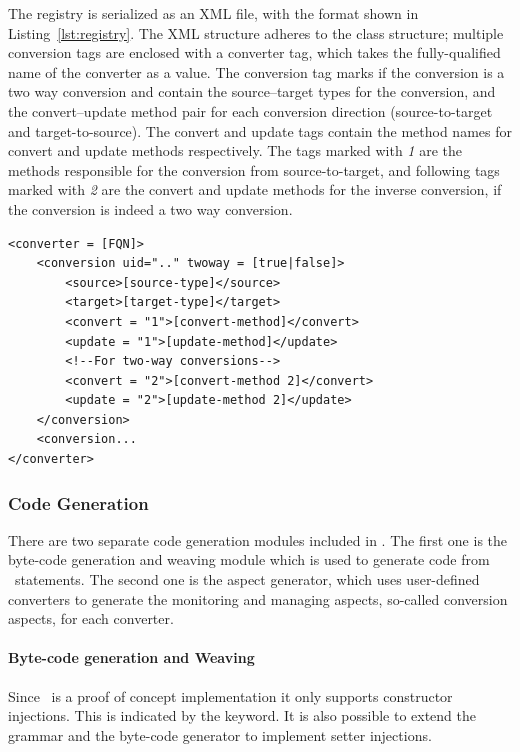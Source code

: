 The registry is serialized as an XML file, with the format shown in Listing~\ref{lst:registry}. 
The XML structure adheres to the class structure; multiple conversion tags are enclosed with a converter tag, which takes the fully-qualified name of the converter as a value. 
The conversion tag marks if the conversion is a two way conversion and contain the source--target types for the conversion, and the convert--update method pair for each conversion direction (source-to-target and target-to-source). 
The convert and update tags contain the method names for convert and update methods respectively. The tags marked with \emph{1} are the methods responsible for the conversion from source-to-target, and following tags marked with \emph{2} are the convert and update methods for the inverse conversion, if the conversion is indeed a two way conversion. 

\begin{lstlisting}[float, language=XMLRegistry, caption={The XML code for a registry item}, label={lst:registry}]
<converter = [FQN]>
	<conversion uid=".." twoway = [true|false]>
		<source>[source-type]</source>
		<target>[target-type]</target>
		<convert = "1">[convert-method]</convert>
		<update = "1">[update-method]</update>
		<!--For two-way conversions-->
		<convert = "2">[convert-method 2]</convert>
		<update = "2">[update-method 2]</update>
	</conversion>
	<conversion...
</converter>
\end{lstlisting}


\subsubsection{Code Generation}
\label{sec:adapter:codegen}
There are two separate code generation modules included in \zamk. The first one is the byte-code generation and weaving module which is used to generate code from \gluer~statements. 
The second one is the aspect generator, which uses user-defined converters to generate the monitoring and managing aspects, so-called conversion aspects, for each converter.

\paragraph{Byte-code generation and Weaving}
Since \gluer~is a proof of concept implementation it only supports constructor injections. 
This is indicated by the  keyword. 
It is also possible to extend the grammar and the byte-code generator to implement setter injections. 


